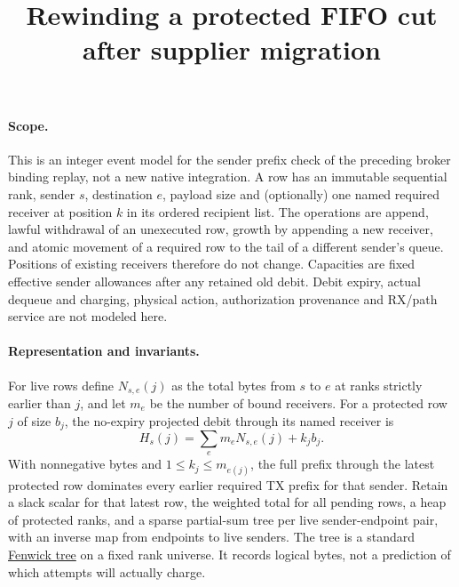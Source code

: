 \documentclass[11pt]{article}
\title{Rewinding a protected FIFO cut after supplier migration}
\author{}\date{}
\begin{document}
\maketitle
\paragraph{Scope.}
This is an integer event model for the sender prefix check of the
preceding broker binding replay, not a new native integration. A row
has an immutable sequential rank, sender \(s\), destination \(e\),
payload size and (optionally) one named required receiver at position
\(k\) in its ordered recipient list. The operations are append, lawful
withdrawal of an unexecuted row, growth by appending a new receiver,
and atomic movement of a required row to the tail of a different sender's
queue. Positions of existing receivers therefore do not change.
Capacities are fixed effective sender allowances after any retained
old debit. Debit expiry, actual dequeue and charging, physical action,
authorization provenance and RX/path service are not modeled here.

\paragraph{Representation and invariants.}
For live rows define \(N_{s,e}(j)\) as the total bytes from \(s\)
to \(e\) at ranks strictly earlier than \(j\), and let \(m_e\)
be the number of bound receivers. For a protected row \(j\) of size \(b_j\),
the no-expiry projected debit through its named receiver is
\[
       H_s(j) = \sum_e m_e N_{s,e}(j) + k_j b_j .
\]
With nonnegative bytes and \(1\le k_j\le m_{e(j)}\), the full
prefix through the latest protected row dominates every earlier
required TX prefix for that sender. Retain a slack scalar for that
latest row, the weighted total for all pending rows, a heap of
protected ranks, and a sparse partial-sum tree per live sender-endpoint
pair, with an inverse map from endpoints to live senders. The tree is a
standard \href{https://doi.org/10.1002/spe.4380240306}{Fenwick tree}
on a fixed rank universe. It records logical bytes, not a prediction of
which attempts will actually charge.
\end{document}
